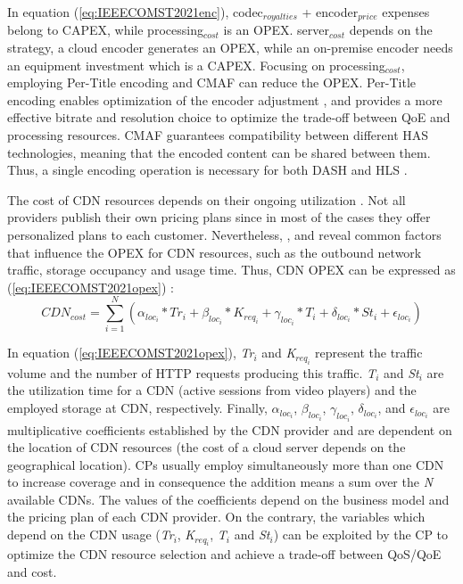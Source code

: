 In equation (\ref{eq:IEEECOMST2021enc}), codec$_{royalties}$ + encoder$_{price}$ expenses belong to CAPEX, while processing$_{cost}$ is an OPEX. server$_{cost}$ depends on the strategy, a cloud encoder generates an OPEX, while an on-premise encoder needs an equipment investment which is a CAPEX. Focusing on processing$_{cost}$, employing Per-Title encoding and CMAF can reduce the OPEX. Per-Title encoding enables optimization of the encoder adjustment \cite{LambeauPerTitle}, and provides a more effective bitrate and resolution choice to optimize the trade-off between QoE and processing resources. CMAF guarantees compatibility between different HAS technologies, meaning that the encoded content can be shared between them. Thus, a single encoding operation is necessary for both DASH and HLS \cite{TimmererCMAF}.

The cost of CDN resources depends on their ongoing utilization \cite{verbrugge2006}. Not all providers publish their own pricing plans since in most of the cases they offer personalized plans to each customer. Nevertheless, \cite{dacast2019}, \cite{CdnCalculator} and \cite{wowza} reveal common factors that influence the OPEX for CDN resources, such as the outbound network traffic, storage occupancy and usage time. Thus, CDN OPEX can be expressed as (\ref{eq:IEEECOMST2021opex}) \cite{Viola2020}:
\begin{equation}
	\label{eq:IEEECOMST2021opex}
	CDN_{cost} = \sum_{i=1}^{N} ( \alpha_{loc_i}*Tr_i + \beta_{loc_i}*K_{req_i} + \gamma_{loc_i}*T_i + \delta_{loc_i}*St_i + \epsilon_{loc_i})
\end{equation}

In equation (\ref{eq:IEEECOMST2021opex}), \textit{Tr$_i$} and \textit{K$_{req_i}$} represent the traffic volume and the number of HTTP requests producing this traffic. \textit{T$_i$} and \textit{St$_i$} are the utilization time for a CDN (active sessions from video players) and the employed storage at CDN, respectively. Finally, $\alpha_{loc_i}$, $\beta_{loc_i}$, $\gamma_{loc_i}$, $\delta_{loc_i}$, and $\epsilon_{loc_i}$ are multiplicative coefficients established by the CDN provider and are dependent on the location of CDN resources (the cost of a cloud server depends on the geographical location). CPs usually employ simultaneously more than one CDN to increase coverage and in consequence the addition means a sum over the \textit{N} available CDNs. The values of the coefficients depend on the business model and the pricing plan of each CDN provider. On the contrary, the variables which depend on the CDN usage (\textit{Tr$_i$}, \textit{K$_{req_i}$}, \textit{T$_i$} and \textit{St$_i$}) can be exploited by the CP to optimize the CDN resource selection and achieve a trade-off between QoS/QoE and cost.

